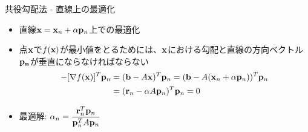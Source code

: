 \begin{frame}[t,fragile]{共役勾配法 - 直線上の最適化}
  \begin{itemize}
    \setlength{\itemsep}{1em}
  \item 直線${\bf x} = {\bf x}_n + \alpha {\bf p}_n$上での最適化
  \item 点${\bf x}$で$f({\bf x})$が最小値をとるためには、${\bf x}$における勾配と直線の方向ベクトル${\bf p_n}$が垂直にならなければならない
    \begin{align*}
      -[\nabla f({\bf x})]^T {\bf p}_n &= ({\bf b} - A {\bf x})^T {\bf p}_n
      = ({\bf b} - A ({\bf x}_n+\alpha {\bf p}_n))^T {\bf p}_n \\ &= ({\bf r}_n - \alpha A {\bf p}_n)^T {\bf p}_n = 0
    \end{align*}
  \item 最適解: $\displaystyle \alpha_n = \frac{{\bf r}_n^T {\bf p}_n}{{\bf p}_n^T A {\bf p}_n}$
  \end{itemize}
\end{frame}

